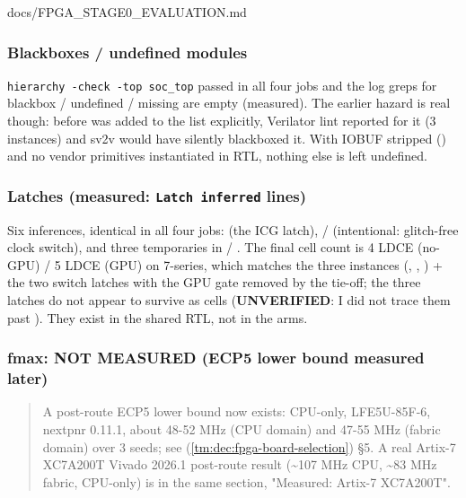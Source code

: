 \begin{relocated}{docs/FPGA_STAGE0_EVALUATION.md}
\subsubsection{Blackboxes / undefined modules}\label{tm:dec:fpga-stage0-evaluation:23-blackboxes-undefined-modules}

\texttt{hierarchy\ -\allowbreak{}check\ -\allowbreak{}top\ soc\_\allowbreak{}top}
passed in all four jobs and the log greps for blackbox / undefined /
missing are empty (measured). The earlier hazard is real though: before
 was added to the list explicitly, Verilator
lint reported  for it (3 instances) and sv2v would have
silently blackboxed it. With IOBUF stripped () and no
vendor primitives instantiated in RTL, nothing else is left undefined.

\subsubsection{\texorpdfstring{Latches (measured:
\texttt{Latch\ inferred} lines)}{Latches (measured:  lines)}}\label{tm:dec:fpga-stage0-evaluation:24-latches-measured-latch-inferred-lines}

Six  inferences, identical in all four jobs:
 (the ICG latch),
 /  (intentional: glitch-free
clock switch), and three  temporaries in
 / . The final cell count is 4
LDCE (no-GPU) / 5 LDCE (GPU) on 7-series, which matches the three
 instances (, ,
) + the two switch latches with the GPU gate removed by
the tie-off; the three  latches do not appear to
survive as cells (\textbf{UNVERIFIED}: I did not trace them past
). They exist in the shared RTL, not in the  arms.

\subsubsection{fmax: NOT MEASURED (ECP5 lower bound measured later)}\label{tm:dec:fpga-stage0-evaluation:25-fmax-not-measured-ecp5-lower-bound-measured-later}

\begin{quote}
A post-route ECP5 lower bound now exists: CPU-only, LFE5U-85F-6, nextpnr
0.11.1, about 48-52 MHz (CPU domain) and 47-55 MHz (fabric domain) over
3 seeds; see
 (\cref{tm:dec:fpga-board-selection}) §5.
A real Artix-7 XC7A200T Vivado 2026.1 post-route result
(\textasciitilde107 MHz CPU, \textasciitilde83 MHz fabric, CPU-only) is
in the same section, "Measured: Artix-7 XC7A200T".
\end{quote}


\end{relocated}

